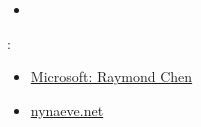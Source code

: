 \begin{itemize}
\item \Russinovich
\end{itemize}

:

\begin{itemize}
\item \href{http://go.yurichev.com/17025}{Microsoft: Raymond Chen}
\item \href{http://go.yurichev.com/17026}{nynaeve.net}
\end{itemize}


